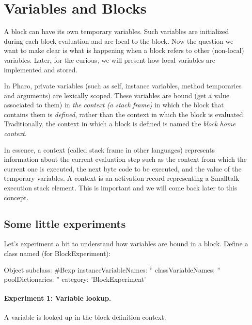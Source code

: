 \documentclass[a4paper,10pt,twoside]{book}
\begin{document}
\section{Variables and Blocks}
A block can have its own temporary variables. Such variables are initialized during each block evaluation and are local to the block. Now the question we want to make clear is what is happening when a block refers to other (non-local) variables. Later, for the curious, we will present how local variables are implemented and stored.

In Pharo, private variables (such as self, instance variables, method temporaries and arguments) are lexically scoped. These variables are bound (get a value associated to them) in \emph{the context (a stack frame)} in which the block that contains them is \emph{defined}, rather than the context in which the block is evaluated.  Traditionally, the context in which a block is defined is named the \emph{block home context}.

In essence, a context (called stack frame in other languages) represents information about the current evaluation step such as the context from which the current one is executed, the next byte code to be executed, and the value of the temporary variables. A context is an activation record representing a Smalltalk execution stack element. This is important and we will come back later to this concept.

\subsection{Some little experiments}
Let's experiment a bit to understand how variables are bound in a block. Define a class named  (for BlockExperiment):

\begin{code}{}
Object subclass: #Bexp
	instanceVariableNames: ''
	classVariableNames: ''
	poolDictionaries: ''
	category: 'BlockExperiment'
\end{code}


\paragraph{Experiment 1: Variable lookup.} A variable is looked up in the block definition context.
\end{document}
